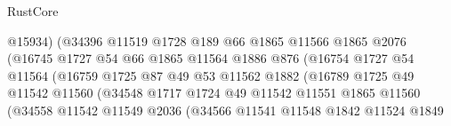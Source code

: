 \begin{lexlean}{RustCore}
\begin{coremodule}
                                      @15934)
                                    (@34396
                                      @11519
                                      @1728
                                      @189
                                      @66
                                      @1865
                                      @11566
                                      @1865
                                      @2076
                                      (@16745
                                        @1727
                                        @54
                                        @66
                                        @1865
                                        @11564
                                        @1886
                                        @876
                                        (@16754
                                          @1727
                                          @54
                                          @11564
                                          (@16759
                                            @1725
                                            @87
                                            @49
                                            @53
                                            @11562
                                            @1882
                                            (@16789
                                              @1725
                                              @49
                                              @11542
                                              @11560
                                              (@34548
                                                @1717
                                                @1724
                                                @49
                                                @11542
                                                @11551
                                                @1865
                                                @11560
                                                (@34558
                                                  @11542
                                                  @11549
                                                  @2036
                                                  (@34566
                                                    @11541
                                                    @11548
                                                    @1842
                                                    @11524
                                                    @1849

\end{coremodule}
\end{lexlean}

